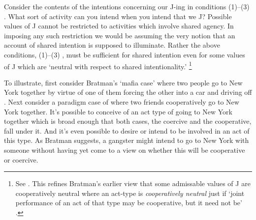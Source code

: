 \documentclass[12pt,\papersize]{extarticle}
\begin{document}
Consider the contents of the intentions concerning our J-ing in conditions (1)--(3) . 
What sort of activity can you intend when you intend that we J?
Possible values of J cannot be restricted to activities which involve shared agency.
In imposing any such restriction we would be assuming the very notion that an account of shared intention is supposed to illuminate. 
%
Rather the above  conditions, (1)--(3) , must be sufficient for shared intention even for some values of J which are `neutral with respect to shared intentionality.'%
\footnote{
See \citet[p.\ 147]{Bratman:1999fr}.
 This refines Bratman's earlier view that some admissable values of J are cooperatively neutral 
 	where an  act-type is \emph{cooperatively neutral} just if `joint performance of an act of that type may be cooperative, but it need not be' \citep[p.\ 330]{Bratman:1992mi}. 
}

To illustrate, first consider Bratman's `mafia case' where two people go to New York together by virtue of one of them forcing the other into a car and driving off \citep[p.\ 333]{Bratman:1992mi}. 
Next consider a paradigm case of where two friends cooperatively go to New York together.
It's possible to conceive of an act type of going to New York together which is broad enough that both cases, the coercive and the cooperative, fall under it.
And it's even possible to desire or intend to be involved in an act of this type.
As Bratman suggests,
a gangster might intend to go to New York with someone without having yet come to a view on whether this will be cooperative or coercive.
\end{document}
